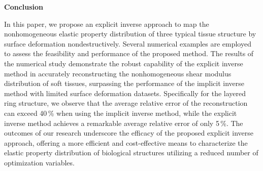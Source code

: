 \documentclass[11pt]{article}
\begin{document}
\vspace{0.5em}

\noindent\textbf{Conclusion}

\vspace{0.3em}

\noindent
In this paper, we propose an explicit inverse approach to map
the nonhomogeneous elastic property distribution of three
typical tissue structure by surface deformation nondestructively.
Several numerical examples are employed to assess the
feasibility and performance of the proposed method. The results
of the numerical study demonstrate the robust capability of the
explicit inverse method in accurately reconstructing the
nonhomogeneous shear modulus distribution of soft tissues,
surpassing the performance of the implicit inverse method with
limited surface deformation datasets. Specifically for the
layered ring structure, we observe that the average relative
error of the reconstruction can exceed 40\,\% when using the
implicit inverse method, while the explicit inverse method
achieves a remarkable average relative error of only 5\,\%.
The outcomes of our research underscore the efficacy of the
proposed explicit inverse approach, offering a more efficient
and cost-effective means to characterize the elastic property
distribution of biological structures utilizing a reduced
number of optimization variables.

\end{document}
